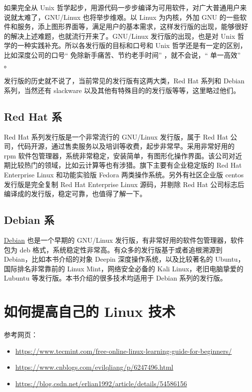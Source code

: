 \documentclass[doctor,openright,twoside]{sjtuthesis}
\providecommand{\tightlist}{%
    \setlength{\itemsep}{0pt}\setlength{\parskip}{0pt}}
\theoremstyle{plain}
\theoremstyle{definition}
\theoremstyle{remark}
\theoremstyle{ocrenumbox}
\theoremstyle{plain}
\begin{document}
如果完全从 Unix 哲学起步，用源代码一步步编译为可用软件，对广大普通用户来说就太难了，GNU/Linux 也将举步维艰。以 Linux 为内核，外加 GNU 的一些软件和服务，添上图形界面等，满足用户的基本需求，这样发行版的出现，能够很好的解决上述难题，也就流行开来了。GNU/Linux 发行版的出现，也是对 Unix 哲学的一种实践补充。所以各发行版的目标和口号和 Unix 哲学还是有一定的区别，比如深度公司的口号`` 免除新手痛苦、节约老手时间'' ，就不会说，`` 单一高效'' 。

发行版的历史就不说了，当前常见的发行版有这两大类，Red Hat 系列和 Debian 系列，当然还有 slackware 以及其他有特殊目的的发行版等等，这里略过他们。

\hypertarget{red-hat-}{%
\subsection{Red Hat 系}\label{red-hat-}}

Red Hat 系列发行版是一个非常流行的 GNU/Linux 发行版，属于 Red Hat 公司，代码开源，通过售卖服务以及培训等收费，起步非常早。采用非常好用的 rpm 软件包管理器，系统非常稳定，安装简单，有图形化操作界面。该公司对近期比较热门的领域，比如云计算等也有涉猎。旗下主要有企业稳定版的 Red Hat Enterprise Linux 和功能实验版 Fedora 两类操作系统。另外有社区企业版 centos 发行版是完全复制 Red Hat Enterprise Linux 源码，并剔除 Red Hat 公司标志后编译成的发行版，稳定可靠，也值得了解一下。

\hypertarget{debian-}{%
\subsection{Debian 系}\label{debian-}}

\href{https://baike.baidu.com/item/Debian}{Debian} 也是一个早期的 GNU/Linux 发行版，有非常好用的软件包管理器，软件包为 deb 格式，系统稳定性非常高。有众多的发行版基于或者追根溯源到 Debian，比如本书介绍的对象 Deepin 深度操作系统，以及比较著名的 Ubuntu，国际排名非常靠前的 Linux Mint，网络安全必备的 Kali Linux，老旧电脑挚爱的 Lubuntu 等发行版。本书介绍的很多技术均适用于 Debian 系列的发行版。

\hypertarget{linux-}{%
\section{如何提高自己的 Linux 技术}\label{linux-}}

参考网页：

\begin{itemize}
\tightlist
\item
  \url{https://www.tecmint.com/free-online-linux-learning-guide-for-beginners/}
\item
  \url{https://www.cnblogs.com/evilqliang/p/6247496.html}
\item
  \url{https://blog.csdn.net/erlian1992/article/details/54586156}
\end{itemize}
\end{document}
